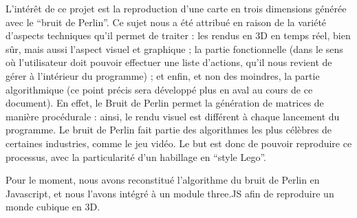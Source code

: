 L'intérêt de ce projet est la reproduction d'une carte en trois dimensions générée avec le "`bruit de Perlin"'. Ce sujet nous a été attribué en raison de la variété d'aspects techniques qu'il permet de traiter : les rendus en 3D en temps réel, bien sûr, mais aussi l'aspect visuel et graphique ; la partie fonctionnelle (dans le sens où l'utilisateur doit pouvoir effectuer une liste d'actions, qu'il nous revient de gérer à l'intérieur du programme) ; et enfin, et non des moindres, la partie algorithmique (ce point précis sera développé plus en aval au cours de ce document).
En effet, le  Bruit de Perlin permet la génération de matrices de manière procédurale : ainsi, le rendu visuel est différent à chaque lancement du programme. Le bruit de Perlin fait partie des algorithmes les plus célèbres de certaines industries, comme le jeu vidéo. Le but est donc de pouvoir reproduire ce processus, avec la particularité d'un habillage en "`style Lego"'.

Pour le moment, nous avons reconstitué l'algorithme du bruit de Perlin en Javascript, et nous l'avons intégré à un module three.JS afin de reproduire un monde cubique en 3D.
